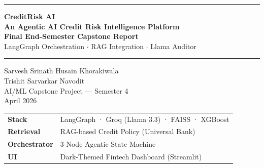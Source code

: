 \documentclass[12pt,a4paper]{article}
\begin{document}
\begin{titlepage}
  \centering
  \vspace*{2cm}

  {\color{primary}\rule{\linewidth}{2pt}}
  \vspace{0.6cm}

  {\Huge\bfseries CreditRisk AI}\\[0.4cm]
  {\Large\bfseries An Agentic AI Credit Risk Intelligence Platform}\\[0.3cm]
  {\large\bfseries\color{primary} Final End-Semester Capstone Report}\\[0.25cm]
  {\large\color{muted} LangGraph Orchestration $\cdot$ RAG Integration $\cdot$ Llama Auditor}

  \vspace{0.6cm}
  {\color{primary}\rule{\linewidth}{1pt}}

  \vspace{1.2cm}

  \vspace{1.5cm}
  {\large Sarvesh Srinath \quad Husain Khorakiwala}\\[0.15cm]
  {\large Trishit Sarvarkar \quad Navodit}\\[0.2cm]
  {\normalsize AI/ML Capstone Project — Semester 4}\\[0.2cm]
  {\normalsize\color{muted} April 2026}

  \vfill

  \begin{tabular}{ll}
    \textbf{Stack}    & LangGraph · Groq (Llama 3.3) · FAISS · XGBoost \\
    \textbf{Retrieval} & RAG-based Credit Policy (Universal Bank) \\
    \textbf{Orchestrator} & 3-Node Agentic State Machine \\
    \textbf{UI}       & Dark-Themed Fintech Dashboard (Streamlit) \\
  \end{tabular}
\end{titlepage}

\tableofcontents
\newpage

\end{document}
